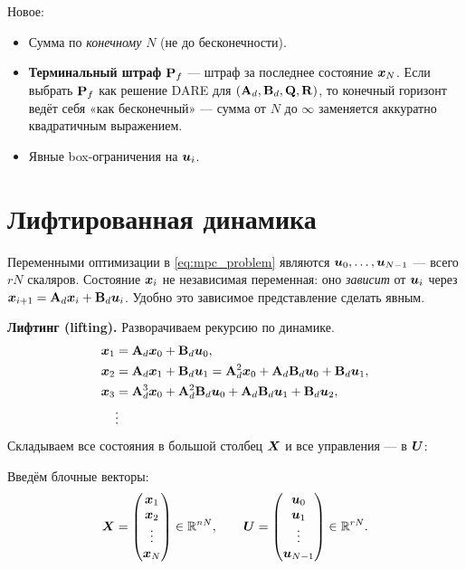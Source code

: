 Новое:
\begin{itemize}
  \item Сумма по \emph{конечному} $N$ (не до бесконечности).
  \item \textbf{Терминальный штраф} $\mathbf{P}_f$ --- штраф за последнее
        состояние $\bm{x}_N$. Если выбрать $\mathbf{P}_f$ как решение DARE
        для $(\mathbf{A}_d, \mathbf{B}_d, \mathbf{Q}, \mathbf{R})$, то конечный горизонт
        ведёт себя «как бесконечный» --- сумма от $N$ до $\infty$
        заменяется аккуратно квадратичным выражением.
  \item Явные box-ограничения на $\bm{u}_i$.
\end{itemize}

\section{Лифтированная динамика}

Переменными оптимизации в \eqref{eq:mpc_problem} являются $\bm{u}_0, \ldots,
\bm{u}_{N-1}$ --- всего $rN$ скаляров. Состояние $\bm{x}_i$ не
независимая переменная: оно \emph{зависит} от $\bm{u}_i$ через
$\bm{x}_{i+1} = \mathbf{A}_d\bm{x}_i + \mathbf{B}_d\bm{u}_i$. Удобно это
зависимое представление сделать явным.

\begin{ideabox}
\textbf{Лифтинг (lifting).} Разворачиваем рекурсию по динамике.
\begin{align*}
  \bm{x}_1 &= \mathbf{A}_d\bm{x}_0 + \mathbf{B}_d\bm{u}_0,\\
  \bm{x}_2 &= \mathbf{A}_d\bm{x}_1 + \mathbf{B}_d\bm{u}_1
              = \mathbf{A}_d^2\bm{x}_0 + \mathbf{A}_d\mathbf{B}_d\bm{u}_0 + \mathbf{B}_d\bm{u}_1,\\
  \bm{x}_3 &= \mathbf{A}_d^3\bm{x}_0 + \mathbf{A}_d^2\mathbf{B}_d\bm{u}_0
              + \mathbf{A}_d\mathbf{B}_d\bm{u}_1 + \mathbf{B}_d\bm{u}_2,\\
             & \vdots
\end{align*}
Складываем все состояния в большой столбец $\bm{X}$ и все управления
--- в $\bm{U}$:
\end{ideabox}

Введём блочные векторы:
\[
  \bm{X} = \begin{pmatrix} \bm{x}_1\\ \bm{x}_2\\ \vdots\\ \bm{x}_N \end{pmatrix} \in \mathbb{R}^{nN},
  \qquad
  \bm{U} = \begin{pmatrix} \bm{u}_0\\ \bm{u}_1\\ \vdots\\ \bm{u}_{N-1} \end{pmatrix} \in \mathbb{R}^{rN}.
\]

